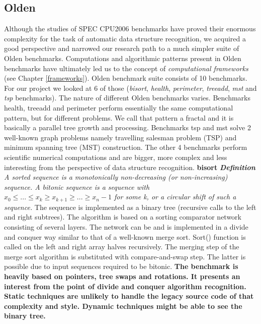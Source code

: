 \subsection{Olden}
\label{background_benchmarks_olden}
\quad Although the studies of SPEC CPU2006 benchmarks have proved their enormous complexity for the task of automatic data structure recognition, we acquired a good perspective and narrowed our research path to a much simpler suite of Olden benchmarks. Computations and algorithmic patterns present in Olden benchmarks have ultimately led us to the concept of \textit{computational frameworks} (see Chapter \ref{frameworks}).\newline\null
\quad Olden benchmark suite consists of 10 benchmarks. For our project we looked at 6 of those (\textit{bisort}, \textit{health}, \textit{perimeter}, \textit{treeadd}, \textit{mst} and \textit{tsp} benchmarks). The nature of different Olden benchmarks varies. Benchmarks health, treeadd and perimeter perform essentially the same computational pattern, but for different problems. We call that pattern a fractal and it is basically a parallel tree growth and processing. Benchmarks tsp and mst solve 2 well-known graph problems namely travelling salesman problem (TSP) and minimum spanning tree (MST) construction. The other 4 benchmarks perform scientific numerical computations and are bigger, more complex and less interesting from the perspective of data structure recognition.\newline\null
\quad \textbf{bisort} \quad \textit{\textbf{Definition} A sorted sequence is a monotonically non-decreasing (or non-increasing) sequence. A bitonic sequence is a sequence with $x_{0} \leq ... \leq x_{k} \geq x_{k+1} \geq ... \geq x_{n} - 1$ for some k, or a circular shift of such a sequence.}\newline\null
\quad The sequence is implemented as a binary tree (recursive calls to the left and right subtrees). The algorithm is based on a sorting comparator network consisting of several layers. The network can be and is implemented in a divide and conquer way similar to that of a well-known merge sort. Sort() function is called on the left and right array halves recursively. The merging step of the merge sort algorithm is substituted with compare-and-swap step. The latter is possible due to input sequences required to be bitonic.\newline\null
\quad\textbf{The benchmark is heavily based on pointers, tree swaps and rotations. It presents an interest from the point of divide and conquer algorithm recognition. Static techniques are unlikely to handle the legacy source code of that complexity and style. Dynamic techniques might be able to see the binary tree.}\newline\null
